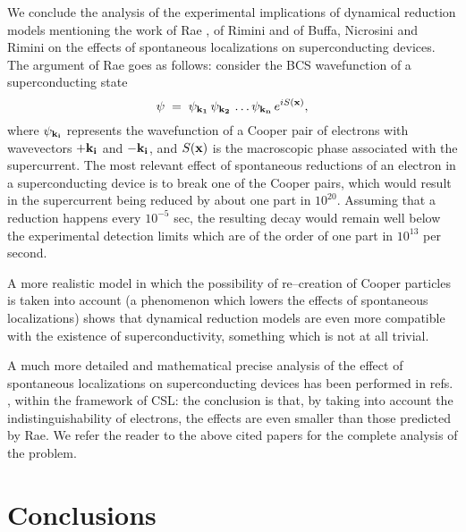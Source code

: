 \documentclass[10pt,a4paper]{article}
\begin{document}
We conclude the analysis of the experimental implications of
dynamical reduction models mentioning the work of Rae \cite{rae},
of Rimini \cite{rimg} and of Buffa, Nicrosini and Rimini
\cite{bnr} on the effects of spontaneous localizations on
superconducting devices. The argument of Rae \cite{rae} goes as
follows: consider the BCS wavefunction \cite{bcs} of a
superconducting state
\begin{equation}
\psi \; = \; \psi_{\bf k_{1}}\, \psi_{\bf k_{2}}\, \ldots
\psi_{\bf k_{n}}\, e^{iS({\bf x})},
\end{equation}
where $\psi_{\bf k_{i}}$ represents the wavefunction of a Cooper
pair of electrons with wavevectors $+ {\bf k_{i}}$ and $- {\bf
k_{i}}$, and $S({\bf x})$ is the macroscopic phase associated with
the supercurrent. The most relevant effect of spontaneous
reductions of an electron in a superconducting device is to break
one of the Cooper pairs, which would result in the supercurrent
being reduced by about one part in $10^{20}$. Assuming that a
reduction happens every $10^{-5}$ sec, the resulting decay would
remain well below the experimental detection limits which are of
the order of one part in $10^{13}$ per second.

A more realistic model in which the possibility of re--creation of
Cooper particles is taken into account (a phenomenon which lowers
the effects of spontaneous localizations) shows that dynamical
reduction models are even more compatible with the existence of
superconductivity, something which is not at all trivial.

A much more detailed and mathematical precise analysis of the
effect of spontaneous localizations on superconducting devices has
been performed in refs. \cite{rimg,bnr}, within the framework of
CSL: the conclusion is that, by taking into account the
indistinguishability of electrons, the effects are even smaller
than those predicted by Rae. We refer the reader to the above
cited papers for the complete analysis of the problem.

\section{Conclusions}
\end{document}
